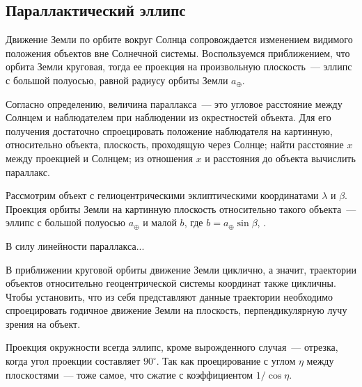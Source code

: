 \subsection{Параллактический эллипс}
Движение Земли по орбите вокруг Солнца сопровождается изменением видимого положения объектов вне Солнечной системы. Воспользуемся приближением, что орбита Земли круговая, тогда ее проекция на произвольную плоскость~--- эллипс с большой полуосью, равной радиусу орбиты Земли $a_\oplus$. 

Согласно определению, величина параллакса~--- это угловое расстояние между Солнцем и наблюдателем при наблюдении из окрестностей объекта. Для его получения достаточно спроецировать положение наблюдателя на картинную, относительно объекта, плоскость, проходящую через Солнце; найти расстояние $x$ между проекцией и Солнцем; из отношения $x$ и расстояния до объекта вычислить параллакс.

Рассмотрим объект с гелиоцентрическими эклиптическими координатами $\lambda$ и $\beta$. Проекция орбиты Земли на картинную плоскость относительно такого объекта~--- эллипс с большой полуосью $a_\oplus$ и малой $b$, где $b = a_\oplus \sin \beta$, . %

В силу линейности параллакса... %

В приближении круговой орбиты движение Земли циклично, а значит, траектории объектов относительно геоцентрической системы координат также цикличны. Чтобы установить, что из себя представляют данные траектории необходимо спроецировать годичное движение Земли на плоскость, перпендикулярную лучу зрения на объект.

Проекция окружности всегда эллипс, кроме вырожденного случая~--- отрезка, когда угол проекции составляет $90^\circ$. Так как проецирование с углом $\eta$ между плоскостями~--- тоже самое, что сжатие с коэффициентом $1/\cos\eta$.

